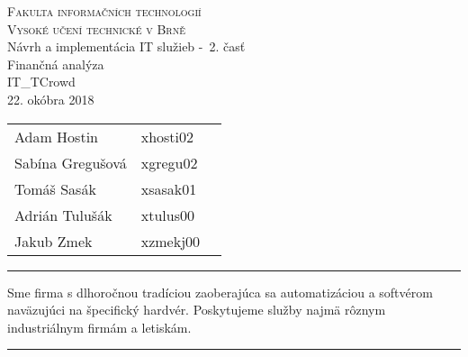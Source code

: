 \documentclass[a4paper, 11pt]{article}
\begin{document}
\begin{center}
\Huge
\textsc{Fakulta informačních technologií\\
Vysoké učení technické v Brně}
\\[84mm]
\LARGE Návrh a implementácia IT služieb \--\ 2. časť\\
\Huge Finančná analýza\\
\vspace{3.5cm}
\LARGE IT\_TCrowd\\
\Large 22. okóbra 2018
\end{center}

\hfill

\begin{minipage}[l]{0.6 \textwidth}
\Large
\begin{tabular}{l l l}
Adam Hostin  & xhosti02\\
Sabína Gregušová & xgregu02\\
Tomáš Sasák & xsasak01 \\
Adrián Tulušák  & xtulus00 \\
Jakub Zmek & xzmekj00 \\
\end{tabular}
\end{minipage}
\thispagestyle{empty}
\clearpage

\setcounter{page}{1}
\noindent\rule{\textwidth}{1pt}
\begin{center}
Sme firma s dlhoročnou tradíciou zaoberajúca sa automatizáciou a softvérom naväzujúci na špecifický hardvér. Poskytujeme služby najmä rôznym industriálnym firmám a letiskám.  \\
\end{center}
\noindent\rule{\textwidth}{1pt}
\end{document}
